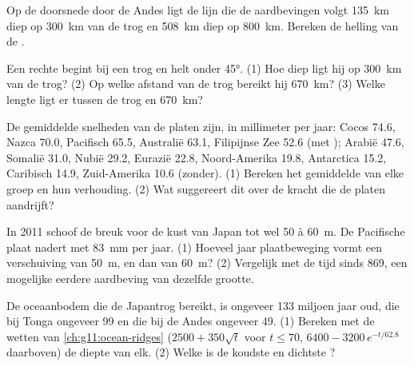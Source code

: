 \begin{exercise}[$\star\star$]\label{exo:g11:subduction-zones:6}
Op de doorsnede door de Andes ligt de lijn die de aardbevingen volgt
\qty{135}{km} diep op \qty{300}{km} van de trog en \qty{508}{km} diep op
\qty{800}{km}. Bereken de helling van de .
\end{exercise}

\begin{exercise}[$\star\star$]\label{exo:g11:subduction-zones:7}
Een rechte  begint bij een trog en helt onder \ang{45}. (1) Hoe diep ligt hij
op \qty{300}{km} van de trog? (2) Op welke afstand van de trog bereikt hij
\qty{670}{km}? (3) Welke lengte  ligt er tussen de trog en
\qty{670}{km}?
\end{exercise}

\begin{exercise}[$\star\star$]\label{exo:g11:subduction-zones:8}
De gemiddelde snelheden van de platen zijn, in millimeter per jaar: Cocos 74.6, Nazca
70.0, Pacifisch 65.5, Australië 63.1, Filipijnse Zee 52.6 (met ); Arabië
47.6, Somalië 31.0, Nubië 29.2, Eurazië 22.8, Noord-Amerika 19.8, Antarctica
15.2, Caribisch 14.9, Zuid-Amerika 10.6 (zonder). (1) Bereken het gemiddelde van
elke groep en hun verhouding. (2) Wat suggereert dit over de kracht die
de platen aandrijft?
\end{exercise}

\begin{exercise}[$\star\star$]\label{exo:g11:subduction-zones:9}
In 2011 schoof de breuk voor de kust van Japan tot wel 50 à \qty{60}{m}. De
Pacifische plaat nadert met \qty{83}{mm} per jaar. (1) Hoeveel jaar plaatbeweging
vormt een verschuiving van \qty{50}{m}, en dan van \qty{60}{m}? (2) Vergelijk met
de tijd sinds 869, een mogelijke eerdere aardbeving van dezelfde grootte.
\end{exercise}

\begin{exercise}[$\star\star$]\label{exo:g11:subduction-zones:10}
De oceaanbodem die de Japantrog bereikt, is ongeveer 133 miljoen jaar oud,
die bij Tonga ongeveer 99 en die bij de Andes ongeveer 49. (1) Bereken met
de wetten van \cref{ch:g11:ocean-ridges} ($2500 + 350\sqrt{t}$ voor
$t \le 70$, $6400 - 3200\,e^{-t/62.8}$ daarboven) de diepte van elk. (2)
Welke is de koudste en dichtste ?
\end{exercise}

